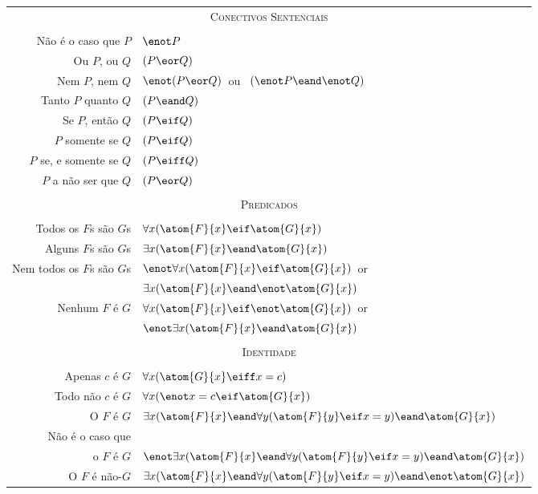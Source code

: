 \begin{center}
\begin{tabular*}{\textwidth}{rl}
\multicolumn{2}{c}{\textsc{Conectivos Sentenciais}}\\ \\
Não é o caso que $P$ & $\enot P$\\
Ou $P$, ou $Q$ & $(P \eor Q)$\\
Nem $P$, nem $Q$ & $\enot(P \eor Q)$\ ou \ $(\enot P \eand \enot Q)$\\
Tanto $P$ quanto $Q$ & $(P \eand Q)$\\
Se $P$, então $Q$ & $(P \eif Q)$\\
$P$ somente se $Q$ & $(P \eif Q)$\\
$P$ se, e somente se $Q$ & $(P \eiff Q)$\\
$P$ a não ser que $Q$ & $(P \eor Q)$\\
\\
\multicolumn{2}{c}{\label{SymbolizingPredicates}\textsc{Predicados}}\\ \\
Todos os $F$s são $G$s & $\forall x(\atom{F}{x} \eif \atom{G}{x})$\\
Alguns $F$s são $G$s & $\exists x(\atom{F}{x} \eand \atom{G}{x})$\\
Nem todos os $F$s são $G$s & $\enot\forall x(\atom{F}{x} \eif \atom{G}{x})$\ or\\
& $\exists x(\atom{F}{x} \eand \enot \atom{G}{x})$\\
Nenhum $F$ é $G$ & $\forall x(\atom{F}{x} \eif\enot \atom{G}{x})$\ or\\
& $\enot\exists x(\atom{F}{x} \eand \atom{G}{x})$\\
\\
\multicolumn{2}{c}{\textsc{Identidade}}\\ \\
Apenas $c$ é $G$ & $\forall x(\atom{G}{x} \eiff x=c)$\\
Todo não $c$ é $G$ & $\forall x(\enot x = c \eif \atom{G}{x} )$\\
O $F$ é $G$ & $\exists x(\atom{F}{x} \eand \forall y(\atom{F}{y} \eif x=y) \eand \atom{G}{x} )$\\
Não é o caso que\\
 o $F$ é $G$ & $\enot\exists x(\atom{F}{x} \eand \forall y(\atom{F}{y} \eif x=y) \eand \atom{G}{x} )$\\
O $F$ é não-$G$ & $\exists x(\atom{F}{x} \eand \forall y(\atom{F}{y} \eif x=y) \eand \enot \atom{G}{x} )$
\end{tabular*}
\end{center}




